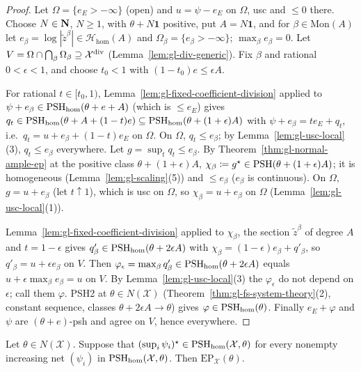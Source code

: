 \begin{proof}
Let $\Omega=\{e_E>-\infty\}$ (open) and $u=\psi-e_E$ on $\Omega$, usc and $\le0$ there. Choose $N\in\mathbf{N}$, $N\ge1$, with $\theta+N\mathbf1$ positive, put $A=N\mathbf 1$, and for
$\beta\in\mathrm{Mon}(A)$ let $e_\beta=\log|\tilde z^\beta|\in\mathcal H_{\mathrm{hom}}(A)$ and $\Omega_\beta=\{e_\beta>-\infty\}$; $\max_\beta e_\beta=0$. Let
$V=\Omega\cap\bigcap_\beta\Omega_\beta\supseteq\mathcal X^{\mathrm{div}}$ (Lemma~\ref{lem:gl-div-generic}). Fix $\beta$ and rational $0<\epsilon<1$, and choose $t_0<1$ with
$(1-t_0)e\le\epsilon A$.

For rational $t\in[t_0,1)$, Lemma~\ref{lem:gl-fixed-coefficient-division} applied to $\psi+e_\beta\in\operatorname{PSH}_{\mathrm{hom}}(\theta+e+A)$ (which is $\le e_E$) gives
$q_t\in\operatorname{PSH}_{\mathrm{hom}}(\theta+A+(1-t)e)\subseteq\operatorname{PSH}_{\mathrm{hom}}(\theta+(1+\epsilon)A)$ with $\psi+e_\beta=te_E+q_t$, i.e.\ $q_t=u+e_\beta+(1-t)e_E$ on $\Omega$. On
$\Omega$, $q_t\le e_\beta$; by Lemma~\ref{lem:gl-usc-local}(3), $q_t\le e_\beta$ everywhere. Let $g=\sup_tq_t\le e_\beta$. By Theorem~\ref{thm:gl-normal-ample-ep} at the
positive class $\theta+(1+\epsilon)A$, $\chi_\beta\coloneqq g^\star\in\operatorname{PSH}(\theta+(1+\epsilon)A)$; it is homogeneous (Lemma~\ref{lem:gl-scaling}(5)) and $\le e_\beta$ ($e_\beta$ is
continuous). On $\Omega$, $g=u+e_\beta$ (let $t\uparrow1$), which is usc on $\Omega$, so $\chi_\beta=u+e_\beta$ on $\Omega$ (Lemma~\ref{lem:gl-usc-local}(1)).

Lemma~\ref{lem:gl-fixed-coefficient-division} applied to $\chi_\beta$, the section $\tilde z^\beta$ of degree $A$ and $t=1-\epsilon$ gives
$q'_\beta\in\operatorname{PSH}_{\mathrm{hom}}(\theta+2\epsilon A)$ with $\chi_\beta=(1-\epsilon)e_\beta+q'_\beta$, so $q'_\beta=u+\epsilon e_\beta$ on $V$. Then
$\varphi_\epsilon=\max_\beta q'_\beta\in\operatorname{PSH}_{\mathrm{hom}}(\theta+2\epsilon A)$ equals $u+\epsilon\max_\beta e_\beta=u$ on $V$. By Lemma~\ref{lem:gl-usc-local}(3) the
$\varphi_\epsilon$ do not depend on $\epsilon$; call them $\varphi$. PSH2 at $\theta\in N(\mathcal X)$ (Theorem~\ref{thm:gl-fs-system-theory}(2), constant sequence,
classes $\theta+2\epsilon A\to\theta$) gives $\varphi\in\operatorname{PSH}_{\mathrm{hom}}(\theta)$. Finally $e_E+\varphi$ and $\psi$ are $(\theta+e)$-psh and agree on $V$, hence everywhere.
\end{proof}

\begin{proposition}\label{prop:gl-homogeneous-slices}
\leanok
{}
Let $\theta\in N(\mathcal X)$. Suppose that $(\sup_i\psi_i)^\star\in\operatorname{PSH}_{\mathrm{hom}}(\mathcal X,\theta)$ for every nonempty increasing net $(\psi_i)$ in
$\operatorname{PSH}_{\mathrm{hom}}(\mathcal X,\theta)$. Then $\mathrm{EP}_{\mathcal X}(\theta)$.
\end{proposition}

